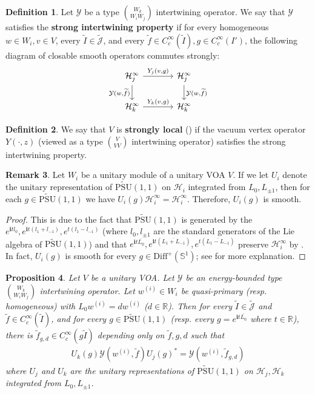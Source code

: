 \documentclass[11pt,b5paper,notitlepage]{article}
\theoremstyle{definition}
\newtheorem{df}{Definition}[section]
\newtheorem{rem}[df]{Remark}
\theoremstyle{plain}
\newtheorem{pp}[df]{Proposition}
\newcommand{\mc}{\mathcal}
\newcommand{\wtd}{\widetilde}
\newcommand{\ovl}{\overline}
\newcommand{\Diffp}{\mathrm{Diff}^+}
\newcommand{\Jtd}{\widetilde{\mathcal J}}
\newcommand{\im}{\mathbf{i}}
\newcommand{\Rbb}{\mathbb R}
\newcommand{\UPSU}{\widetilde{\mathrm{PSU}}(1,1)}
\newcommand{\Sbb}{{\mathbb S}}
\numberwithin{equation}{section}
\begin{document}
\begin{df}\label{lb101}
Let $\mc Y$ be a type $W_k\choose W_i W_j$ intertwining operator. We say that $\mc Y$ satisfies the \textbf{strong intertwining property} if for every homogeneous $w\in W_i,v\in V$, every $\wtd I\in\Jtd$, and every $\wtd f\in C_c^\infty(\wtd I),g\in C_c^\infty(I')$, the following diagram of closable smooth operators commutes strongly:
\begin{equation}\label{eq42}
\begin{tikzcd}[column sep=large]
\mc H_j^\infty \arrow[d,"{\mc Y(w,\wtd f)}"'] \arrow[r,"{Y_j(v,g)}"] & \mc H_j^\infty \arrow[d,"{\mc Y(w,\wtd f)}"] \\
\mc H_k^\infty \arrow[r,"{Y_k(v,g)}"]           & \mc H_k^\infty          
\end{tikzcd}
\end{equation}
\end{df}


\begin{df}
We say that $V$ is \textbf{strongly local} (\cite{CKLW18}) if the vacuum vertex operator $Y(\cdot,z)$ (viewed as a type $V\choose VV$ intertwining operator) satisfies the strong intertwining property.
\end{df}


\begin{rem}\label{lb56}
Let $W_i$ be a unitary module of a unitary VOA $V$. If we let $U_i$ denote the unitary representation of $\UPSU$ on $\mc H_i$ integrated from $L_0,L_{\pm1}$, then for each $g\in\UPSU$ we have $U_i(g)\mc H_i^\infty=\mc H_i^\infty$. Therefore, $U_i(g)$ is smooth.
\end{rem}


\begin{proof}
This is due to the fact that $\UPSU$ is generated by the $e^{\im t l_0},e^{\im t (l_1+l_{-1})},e^{t(l_1-l_{-1})}$ (where $l_0,l_{\pm 1}$ are the standard generators of the Lie algebra of $\UPSU$) and that $e^{\im t \ovl{L_0}},e^{\im t (\ovl{L_1+L_{-1}})},e^{t(\ovl{L_1-L_{-1}})}$ preserve $\mc H_i^\infty$ by \cite[Prop. 2.1]{TL99}. In fact, $U_i(g)$ is smooth for every $g\in\Diffp(\Sbb^1)$; see \cite[Sec. 2.2]{Gui20} for more explanation.
\end{proof}


\begin{pp}\label{lb51}
Let $V$ be a unitary VOA. Let $\mc Y$ be an energy-bounded type $W_k\choose W_i W_j$ intertwining operator. Let $w^{(i)}\in W_i$ be quasi-primary (resp. homogeneous) with $L_0w^{(i)}=dw^{(i)}$ ($d\in\Rbb$). Then for every $\wtd I\in\Jtd$ and $\wtd f\in C_c^\infty(\wtd I)$, and for every $g\in\UPSU$ (resp. every $g=e^{\im t\ovl{L_0}}$ where $t\in\Rbb$), there is $\wtd f_{g,d}\in C_c^\infty(g\wtd I)$ depending only on $\wtd f,g,d$ such that
\begin{align}
U_k(g)\mc Y(w^{(i)},\wtd f)U_j(g)^*=\mc Y(w^{(i)},\wtd f_{g,d})
\end{align}
where $U_j$ and $U_k$ are the unitary representations of $\UPSU$ on $\mc H_j,\mc H_k$ integrated from $L_0,L_{\pm1}$.
\end{pp}
\end{document}
